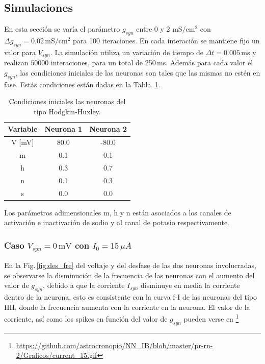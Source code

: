 \subsection{Simulaciones}

En esta sección se varía el parámetro $g_{syn}$ entre $0$ y 2 ${\text{mS}}/{\text{cm}^2}$ con $\Delta g_{syn}=0.02\,{\text{mS}}/{\text{cm}^2}$ para 100 iteraciones. En cada interación se mantiene fijo un valor para $V_{syn}$. La simulación utiliza un variación de tiempo de $\Delta t =  0.005\,$ms y realizan $50000$ interaciones, para un total de 250\,ms. Además para cada valor el $g_{syn}$, las condiciones iniciales de las neuronas son tales que las mismas no estén en fase. Estás condiciones están dadas en la Tabla~\ref{tab:ini}. 
    \begin{table}[H]
    \centering
    \begin{tabular}{c| c| c}
    {\bf Variable }& {\bf Neurona 1} & { \bf Neurona 2} \\ \hline
        V [mV]     & 80.0            & -80.0               \\  \hline
        m          & 0.1             & 0.1              \\  \hline
        h          & 0.3             & 0.7               \\  \hline
        n          & 0.1             & 0.3               \\  \hline
        s          & 0.0             & 0.0               \\      
    \end{tabular}
    \caption{Condiciones iniciales las neuronas del tipo Hodgkin-Huxley.}   
         \label{tab:ini}
    \end{table}
Los parámetros adimensionales m, h y n están asociados a los canales de activación e  inactivación de sodio y al canal de potasio respectivamente.

   \subsubsection{Caso \texorpdfstring{$V_{syn}= 0\,\text{mV}$}{}   con  \texorpdfstring{$I_0 = 15\,\mu A$}{}}

    En la Fig.\,\ref{fig:des_fre} del voltaje y del desfase de las dos neuronas involucradas, se observarse la disminución de la frecuencia de las neuronas con el aumento del valor de $g_{syn}$, debido a que la corriente $I_{syn}$ disminuye en media la corriente dentro de la neurona, esto es consistente con la curva f-I de las neuronas del tipo HH, donde la frecuencia aumenta con la corriente en la neurona.  El valor de la corriente, así como los spikes en función del valor de $g_{syn}$ pueden verse en \footnote{\url{https://github.com/astrocronopio/NN_IB/blob/master/pr-rn-2/Graficos/current_15.gif}}



